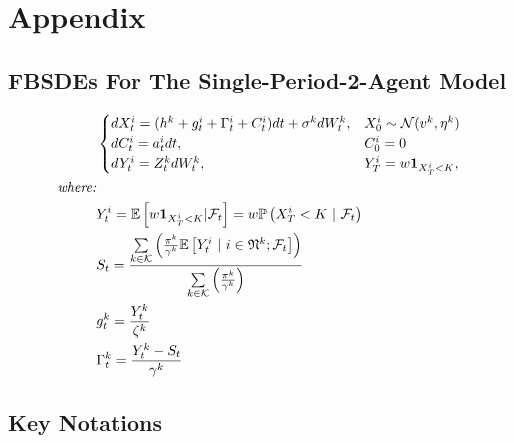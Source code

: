 \documentclass[a4paper,10pt]{article}
\newcommand{\1}{\mathbf{1}}
\begin{document}
\newpage
\section*{Appendix}
\subsection*{FBSDEs For The Single-Period-2-Agent Model}

\begin{alignat}{2}
    &\begin{cases}
        dX_t^{i} = (h^{k} + g_t^{i} + \Gamma_t^{i} + C_t^{i})dt + \sigma^{k}dW_t^{k},  &X_0^{i} \sim \mathcal{N}(v^k,\eta^k) \notag \\
        dC_t^{i} = a_t^{i}dt, &C_0^{i}=0 \notag \\
        dY_t^{i} = Z_t^{k}dW_t^{k}, &Y_{T}^{i} = w\mathbf{1}_{X_{T}^i<K}, \notag \\
    \end{cases}\\
    \textit{where:}&\\
        &Y_t^i = \mathbb{E} \left[w\mathbf{1}_{X_{T}^i< K}|\mathcal{F}_t \right] = w\mathbb{P}\left(X_{T}^i< K ~|~ \mathcal {F}_t\right) \notag \\
        &S_t = \frac{\sum\limits_{k \in \mathcal{K}} {\left(\frac{\pi^k}{\gamma^k}\mathbb{E}\left[ Y_t^i ~|~ i \in \mathfrak{N}^k; \mathcal{F}_t \right]\right)} }{\sum\limits_{k \in \mathcal{K}}{\left(\frac{\pi^k}{\gamma^k}\right)}} \notag \\
        &g_t^k = \frac{Y_t^k}{\zeta^k} \notag \\
        &\Gamma_t^{k} = \frac{Y_t^{k}-S_t}{\gamma^{k}} 
\end{alignat}


\subsection*{Key Notations}
\end{document}
